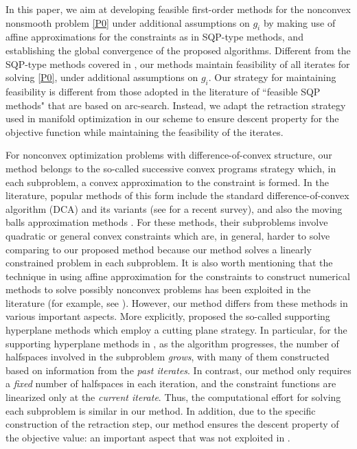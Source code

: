 \documentclass[10pt]{article}
\numberwithin{equation}{section}
\begin{document}
In this paper, we aim at developing feasible first-order methods for the nonconvex nonsmooth problem \eqref{P0} under additional assumptions on $g_i$ by making use of affine approximations for the constraints as in SQP-type methods, and establishing the global convergence of the proposed algorithms. Different from the SQP-type methods covered in \cite{Au13,BoPau16}, our methods maintain feasibility of all iterates for solving \eqref{P0}, under additional assumptions on $g_i$. Our strategy for maintaining feasibility is different from those adopted in the literature of ``feasible SQP methods" that are based on arc-search. Instead, we adapt the retraction strategy used in manifold optimization \cite{ChenMA20,ChenZM19} in our scheme to ensure descent property for the objective function while maintaining the feasibility of the iterates.

{\color{blue} For nonconvex optimization problems with difference-of-convex structure, our method belongs to
the so-called successive convex programs strategy which, in each subproblem, a convex approximation to the constraint is formed. In the literature, popular methods of this form include the standard difference-of-convex algorithm (DCA) and its variants (see \cite{DCA18} for a recent survey), and also the moving balls approximation methods \cite{Au13,AuSheTeb10,BoPau16,YuLP20}. For these methods, their subproblems involve quadratic or general convex constraints which are, in general, harder to solve comparing to our proposed method because our method solves a linearly constrained problem in each subproblem.  It is also worth mentioning that the technique in using affine approximation for the constraints to construct numerical methods to solve possibly nonconvex problems has been exploited in the literature  (for example, see \cite{Veinott,AckOli16}). However, our method differs from these methods in various important aspects. More explicitly, \cite{Veinott,AckOli16} proposed the so-called supporting hyperplane methods which employ a cutting plane strategy. In particular, for the supporting hyperplane methods in \cite{Veinott,AckOli16}, as the algorithm progresses, the number of halfspaces involved in the subproblem {\em grows}, with many of them constructed based on information from the \emph{past iterates}. In contrast, our method only requires a {\it fixed} number of halfspaces in each iteration, and the constraint functions are linearized only at the \emph{current iterate}. Thus, the computational effort for solving each subproblem is similar in our method. In addition, due to the specific construction of the retraction step, our method ensures the descent property of the objective value: an important aspect that was not exploited in \cite{Veinott,AckOli16}.
}
\end{document}
